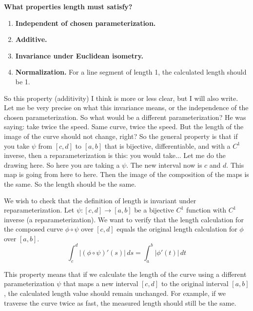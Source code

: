 \begin{math_stroke}
\textbf{What properties length must satisfy?}
\begin{enumerate}
    \item \textbf{Independent of chosen parameterization.}
    \item \textbf{Additive.}
    \item \textbf{Invariance under Euclidean isometry.}
    \item \textbf{Normalization.} For a line segment of length 1, the calculated length should be 1.
\end{enumerate}
\end{math_stroke}

\begin{spoken_clean}[00:14:46 - 00:15:30]
So this property (additivity) I think is more or less clear, but I will also write. Let me be very precise on what this invariance means, or the independence of the chosen parameterization. So what would be a different parameterization? He was saying: take twice the speed. Same curve, twice the speed. But the length of the image of the curve should not change, right? So the general property is that if you take $\psi$ from $[c,d]$ to $[a,b]$ that is bijective, differentiable, and with a $C^1$ inverse, then a reparameterization is this: you would take... Let me do the drawing here. So here you are taking a $\psi$. The new interval now is $c$ and $d$. This map is going from here to here. Then the image of the composition of the maps is the same. So the length should be the same.
\end{spoken_clean}

\begin{math_stroke}
We wish to check that the definition of length is invariant under reparameterization. Let $\psi: [c,d] \to [a,b]$ be a bijective $C^1$ function with $C^1$ inverse (a reparameterization). We want to verify that the length calculation for the composed curve $\phi \circ \psi$ over $[c,d]$ equals the original length calculation for $\phi$ over $[a,b]$.
\[
\int_c^d |(\phi \circ \psi)'(s)| \, ds = \int_a^b |\phi'(t)| \, dt
\]
\begin{explanation-of-steps}
This property means that if we calculate the length of the curve using a different parameterization $\psi$ that maps a new interval $[c,d]$ to the original interval $[a,b]$, the calculated length value should remain unchanged. For example, if we traverse the curve twice as fast, the measured length should still be the same.
\end{explanation-of-steps}
\end{math_stroke}

